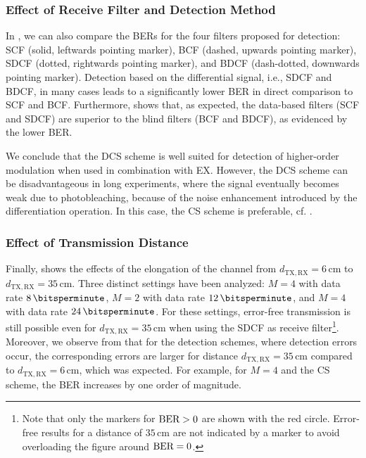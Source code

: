 \subsubsection{Effect of Receive Filter and Detection Method}\label{sssec:effect_filter_and_detection}
\scaleSubsubsectionBelow
%
In , we can also compare the \acp{BER} for the four filters proposed for detection: \ac{SCF} (solid, leftwards pointing marker), \ac{BCF} (dashed, upwards pointing marker), \ac{SDCF} (dotted, rightwards pointing marker), and \ac{BDCF} (dash-dotted, downwards pointing marker). Detection based on the differential signal, i.e., \ac{SDCF} and \ac{BDCF}, in many cases leads to a significantly lower \ac{BER} in direct comparison to \ac{SCF} and \ac{BCF}. Furthermore,  shows that, as expected, the data-based filters (\ac{SCF} and \ac{SDCF}) are superior to the blind filters (\ac{BCF} and \ac{BDCF}), as evidenced by the lower \ac{BER}.

We conclude that the \ac{DCS} scheme is well suited for detection of higher-order modulation when used in combination with \ac{EX}. However, the \ac{DCS} scheme can be disadvantageous in long experiments, where the signal eventually becomes weak due to photobleaching, because of the noise enhancement introduced by the differentiation operation. In this case, the \ac{CS} scheme is preferable, cf. .
%
\scaleSubsubsection
\subsubsection{Effect of Transmission Distance}\label{sssec:effect_distance}
\scaleSubsubsectionBelow
%
Finally,  shows the effects of the elongation of the channel from $d_{\mathrm{TX},\mathrm{RX}} = 6 \,\si{\centi\meter}$ to $d_{\mathrm{TX},\mathrm{RX}} = 35 \,\si{\centi\meter}$. Three distinct settings have been analyzed: $M=4$ with data rate $\SI{8}{\bitsperminute}$, $M=2$ with data rate $\SI{12}{\bitsperminute}$, and $M=4$ with data rate $\SI{24}{\bitsperminute}$. For these settings, error-free transmission is still possible even for $d_{\mathrm{TX},\mathrm{RX}} = 35 \,\si{\centi\meter}$ when using the \ac{SDCF} as receive filter\footnote{Note that only the markers for $\textnormal{BER}>0$ are shown with the red circle. Error-free results for a distance of $35 \,\si{\centi\meter}$ are not indicated by a marker to avoid overloading the figure around $\textnormal{BER}=0$.}. Moreover, we observe from  that for the detection schemes, where detection errors occur, the corresponding errors are larger for distance $d_{\mathrm{TX},\mathrm{RX}} = 35 \,\si{\centi\meter}$ compared to $d_{\mathrm{TX},\mathrm{RX}} = 6 \,\si{\centi\meter}$, which was expected. For example, for $M=4$ and the \ac{CS} scheme, the \ac{BER} increases by one order of magnitude.
%
\scaleSubsection
